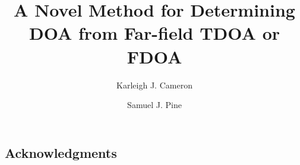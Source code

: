 \documentclass[12pt]{amsart}
\theoremstyle{definition}
\theoremstyle{remark}
\begin{document}
\title{A Novel Method for Determining DOA from Far-field TDOA or FDOA}
\author{Karleigh J. Cameron }
\author{Samuel J. Pine } %




\maketitle















\subsection{Acknowledgments}



\end{document}
